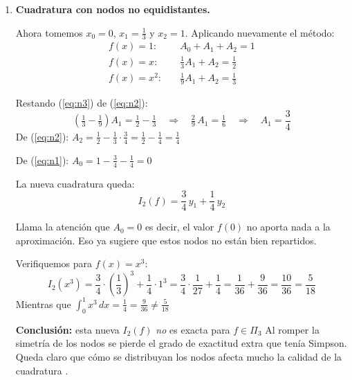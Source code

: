 \documentclass[12pt]{article}
\begin{document}
\begin{enumerate}
\begin{itemize}
		Ese grado de exactitud extra viene de la simetría de los nodos respecto al centro del intervalo, y es algo particular de la regla de Simpson \cite{mathworld_simpson}.

		Para llevar esta fórmula a un intervalo general $[a,b]$ se hace el cambio $x = a + (b-a)\,u$ con $u\in[0,1]$ lo que da
		\[
		\int_a^b f(x)\,dx \approx \frac{b-a}{6}\left[f(a) + 4\,f\!\left(\frac{a+b}{2}\right) + f(b)\right]
		\]
		que es la regla de Simpson ``simple'' sobre $[a,b]$ Cuando se requiere más precisión, se divide $[a,b]$ en $N$ subintervalos (con $N$ par) y se aplica la regla en cada par consecutivo, dando origen a la \textbf{regla de Simpson compuesta} que se emplea en la implementación.
	\end{itemize}

	\item \textbf{Cuadratura con nodos no equidistantes.}

	Ahora tomemos $x_0=0$, $x_1=\tfrac{1}{3}$ y $x_2=1$. Aplicando nuevamente el método:
	\begin{align}
		f(x)=1:   &\quad A_0 + A_1 + A_2 = 1 \label{eq:n1}\\[4pt]
		f(x)=x:   &\quad \tfrac{1}{3}A_1 + A_2 = \tfrac{1}{2} \label{eq:n2}\\[4pt]
		f(x)=x^2: &\quad \tfrac{1}{9}A_1 + A_2 = \tfrac{1}{3} \label{eq:n3}
	\end{align}

	Restando (\ref{eq:n3}) de (\ref{eq:n2}):
	\[
	\left(\tfrac{1}{3} - \tfrac{1}{9}\right)A_1 = \tfrac{1}{2} - \tfrac{1}{3} \quad\Longrightarrow\quad \tfrac{2}{9}\,A_1 = \tfrac{1}{6} \quad\Longrightarrow\quad A_1 = \frac{3}{4}
	\]
	De (\ref{eq:n2}): $A_2 = \tfrac{1}{2} - \tfrac{1}{3}\cdot\tfrac{3}{4} = \tfrac{1}{2} - \tfrac{1}{4} = \tfrac{1}{4}$

	De (\ref{eq:n1}): $A_0 = 1 - \tfrac{3}{4} - \tfrac{1}{4} = 0$

	La nueva cuadratura queda:
	\[
	I_2(f) = \frac{3}{4}\,y_1 + \frac{1}{4}\,y_2
	\]

	Llama la atención que $A_0=0$ es decir, el valor $f(0)$ no aporta nada a la aproximación. Eso ya sugiere que estos nodos no están bien repartidos.

	Verifiquemos para $f(x) = x^3$:
	\[
	I_2(x^3) = \frac{3}{4}\cdot\left(\frac{1}{3}\right)^3 + \frac{1}{4}\cdot 1^3 = \frac{3}{4}\cdot\frac{1}{27} + \frac{1}{4} = \frac{1}{36} + \frac{9}{36} = \frac{10}{36} = \frac{5}{18}
	\]
	Mientras que $\int_0^1 x^3\,dx = \tfrac{1}{4} = \tfrac{9}{36} \neq \tfrac{5}{18}$

	\textbf{Conclusión:} esta nueva $I_2(f)$ \textit{no} es exacta para $f\in\Pi_3$ Al romper la simetría de los nodos se pierde el grado de exactitud extra que tenía Simpson. Queda claro que cómo se distribuyan los nodos afecta mucho la calidad de la cuadratura \cite{chapra07}.
\end{enumerate}
\end{document}
